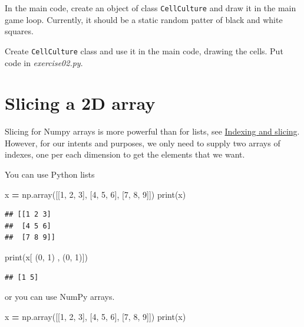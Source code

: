 \documentclass[
]{book}
\newenvironment{Shaded}{\begin{snugshade}}{\end{snugshade}}
\newcommand{\BuiltInTok}[1]{#1}
\newcommand{\DecValTok}[1]{\textcolor[rgb]{0.00,0.00,0.81}{#1}}
\newcommand{\NormalTok}[1]{#1}
\newcommand{\OperatorTok}[1]{\textcolor[rgb]{0.81,0.36,0.00}{\textbf{#1}}}
\begin{document}
In the main code, create an object of class \texttt{CellCulture} and draw it in the main game loop. Currently, it should be a static random patter of black and white squares.

Create \texttt{CellCulture} class and use it in the main code, drawing the cells. Put code in \emph{exercise02.py}.

\hypertarget{slicing-a-2d-array}{%
\section{Slicing a 2D array}\label{slicing-a-2d-array}}

Slicing for Numpy arrays is more powerful than for lists, see \href{https://numpy.org/doc/stable/user/absolute_beginners.html\#indexing-and-slicing}{Indexing and slicing}. However, for our intents and purposes, we only need to supply two arrays of indexes, one per each dimension to get the elements that we want.

You can use Python lists

\begin{Shaded}
\begin{Highlighting}[]
\NormalTok{x }\OperatorTok{=}\NormalTok{ np.array([[}\DecValTok{1}\NormalTok{, }\DecValTok{2}\NormalTok{, }\DecValTok{3}\NormalTok{], [}\DecValTok{4}\NormalTok{, }\DecValTok{5}\NormalTok{, }\DecValTok{6}\NormalTok{], [}\DecValTok{7}\NormalTok{, }\DecValTok{8}\NormalTok{, }\DecValTok{9}\NormalTok{]])}
\BuiltInTok{print}\NormalTok{(x)}
\end{Highlighting}
\end{Shaded}

\begin{verbatim}
## [[1 2 3]
##  [4 5 6]
##  [7 8 9]]
\end{verbatim}

\begin{Shaded}
\begin{Highlighting}[]
\BuiltInTok{print}\NormalTok{(x[ (}\DecValTok{0}\NormalTok{, }\DecValTok{1}\NormalTok{) , (}\DecValTok{0}\NormalTok{, }\DecValTok{1}\NormalTok{)])}
\end{Highlighting}
\end{Shaded}

\begin{verbatim}
## [1 5]
\end{verbatim}

or you can use NumPy arrays.

\begin{Shaded}
\begin{Highlighting}[]
\NormalTok{x }\OperatorTok{=}\NormalTok{ np.array([[}\DecValTok{1}\NormalTok{, }\DecValTok{2}\NormalTok{, }\DecValTok{3}\NormalTok{], [}\DecValTok{4}\NormalTok{, }\DecValTok{5}\NormalTok{, }\DecValTok{6}\NormalTok{], [}\DecValTok{7}\NormalTok{, }\DecValTok{8}\NormalTok{, }\DecValTok{9}\NormalTok{]])}
\BuiltInTok{print}\NormalTok{(x)}
\end{Highlighting}
\end{Shaded}
\end{document}
